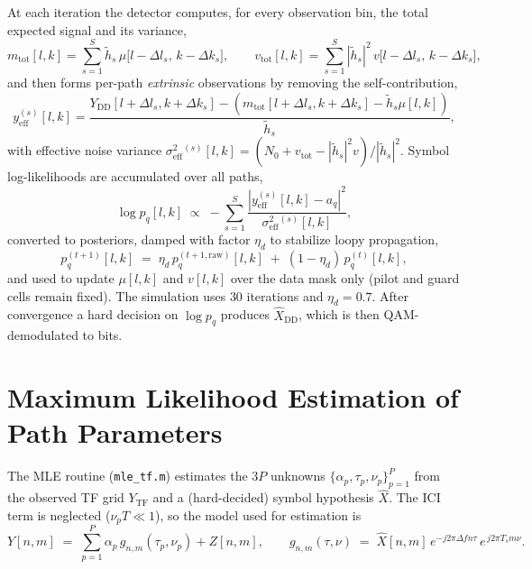 \documentclass[11pt,a4paper]{article}
\newcommand{\deltaf}{\Delta f}
\begin{document}
At each iteration the detector computes, for every observation bin,
the total expected signal and its variance,
\begin{equation}
  m_{\text{tot}}[l,k] = \sum_{s=1}^{S} \tilde h_s\,
  \mu\bigl[l-\Delta l_s,\,k-\Delta k_s\bigr],
  \qquad
  v_{\text{tot}}[l,k] = \sum_{s=1}^{S} |\tilde h_s|^2\,
  v\bigl[l-\Delta l_s,\,k-\Delta k_s\bigr],
\end{equation}
and then forms per-path \emph{extrinsic} observations by removing the
self-contribution,
\begin{equation}
  y_{\text{eff}}^{(s)}[l,k]
  = \frac{Y_{\mathrm{DD}}[l+\Delta l_s,k+\Delta k_s]
        - (m_{\text{tot}}[l+\Delta l_s,k+\Delta k_s] - \tilde h_s \mu[l,k])}
         {\tilde h_s},
\end{equation}
with effective noise variance
$\sigma^{2}_{\text{eff}}{}^{(s)}[l,k] = (N_0 + v_{\text{tot}} -
|\tilde h_s|^2 v)/|\tilde h_s|^2$. Symbol log-likelihoods are
accumulated over all paths,
\begin{equation}
  \log p_q[l,k] \;\propto\; -\sum_{s=1}^{S}
  \frac{|y_{\text{eff}}^{(s)}[l,k] - a_q|^{2}}
       {\sigma^{2}_{\text{eff}}{}^{(s)}[l,k]},
\end{equation}
converted to posteriors, damped with factor $\eta_d$ to stabilize
loopy propagation,
\begin{equation}
  p_q^{(t+1)}[l,k] \;=\; \eta_d\, p_q^{(t+1,\text{raw})}[l,k]
  \;+\; (1-\eta_d)\, p_q^{(t)}[l,k],
\end{equation}
and used to update $\mu[l,k]$ and $v[l,k]$ over the data mask only
(pilot and guard cells remain fixed). The simulation uses
$30$ iterations and $\eta_d = 0.7$. After convergence a hard decision
on $\log p_q$ produces $\hat X_{\mathrm{DD}}$, which is then QAM-
demodulated to bits.

\section{Maximum Likelihood Estimation of Path Parameters}

The MLE routine (\texttt{mle\_tf.m}) estimates the $3P$ unknowns
$\{\alpha_p,\tau_p,\nu_p\}_{p=1}^{P}$ from the observed TF grid
$Y_{\mathrm{TF}}$ and a (hard-decided) symbol hypothesis
$\hat X$. The ICI term is neglected
($\nu_p T \ll 1$), so the model used for estimation is
\begin{equation}
  Y[n,m] \;=\; \sum_{p=1}^{P}\alpha_p\,g_{n,m}(\tau_p,\nu_p) + Z[n,m],
  \qquad
  g_{n,m}(\tau,\nu) \;=\; \hat X[n,m]\,
  e^{-j2\pi \deltaf n \tau}\, e^{\,j2\pi T_s m \nu}.
  \label{eq:mle_model}
\end{equation}
\end{document}
